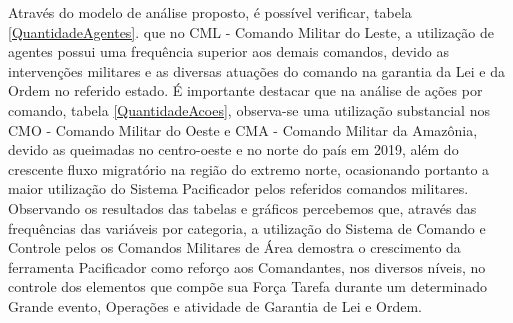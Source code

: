 Através do modelo de análise proposto, é possível verificar, tabela \ref{QuantidadeAgentes}. que no CML - Comando Militar do Leste, a utilização de agentes possui uma frequência superior aos demais comandos, devido as intervenções militares e as diversas atuações do comando na garantia da Lei e da Ordem no referido estado. É importante destacar que na análise de ações por comando, tabela \ref{QuantidadeAcoes}, observa-se uma utilização substancial nos CMO - Comando Militar do Oeste e CMA - Comando Militar da Amazônia, devido as queimadas no centro-oeste e no norte do país em 2019, além do crescente fluxo migratório na região do extremo norte, ocasionando portanto a maior utilização do Sistema Pacificador pelos referidos comandos militares. Observando os resultados das tabelas e gráficos percebemos que, através das frequências das variáveis por categoria, a utilização do Sistema de Comando e Controle pelos os Comandos Militares de Área demostra o crescimento da ferramenta Pacificador como reforço aos Comandantes, nos diversos níveis, no controle dos elementos que compõe sua Força Tarefa durante um determinado Grande evento, Operações e atividade de Garantia de Lei e Ordem. 
 
